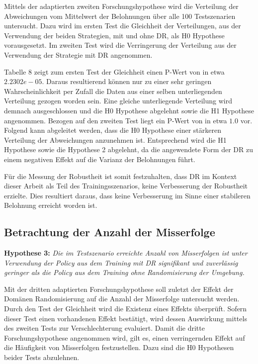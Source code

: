 Mittels der adaptierten zweiten Forschungshypothese wird die Verteilung der Abweichungen vom Mittelwert der Belohnungen über alle 100 Testszenarien untersucht.
Dazu wird im ersten Test die Gleichheit der Verteilungen, aus der Verwendung der beiden Strategien, mit und ohne DR, als H0 Hypothese vorausgesetzt.
Im zweiten Test wird die Verringerung der Verteilung aus der Verwendung der Strategie mit DR angenommen.

Tabelle 8 zeigt zum ersten Test der Gleichheit einen P-Wert von in etwa $2.2302e-05$.
Daraus resultierend können nur zu einer sehr geringen Wahrscheinlichkeit per Zufall die Daten aus einer selben unterliegenden Verteilung gezogen worden sein.
Eine gleiche unterliegende Verteilung wird demnach ausgeschlossen und die H0 Hypothese abgelehnt sowie die H1 Hypothese angenommen.
Bezogen auf den zweiten Test liegt ein P-Wert von in etwa $1.0$ vor.
Folgend kann abgeleitet werden, dass die H0 Hypothese einer stärkeren Verteilung der Abweichungen anzunehmen ist.
Entsprechend wird die H1 Hypothese sowie die Hypothese 2 abgelehnt, da die angewendete Form der DR zu einem negativen Effekt auf die Varianz der Belohnungen führt.

Für die Messung der Robustheit ist somit festzuhalten, dass DR im Kontext dieser Arbeit als Teil des Trainingsszenarios, keine Verbesserung der Robustheit erzielte.
Dies resultiert daraus, dass keine Verbesserung im Sinne einer stabileren Belohnung erreicht worden ist.

\subsection{Betrachtung der Anzahl der Misserfolge}

\textbf{Hypothese 3:}
\textit{Die im Testszenario erreichte Anzahl von Misserfolgen ist unter Verwendung der Policy aus dem Training mit DR signifikant und zuverlässig geringer als die Policy aus dem Training ohne Randomisierung der Umgebung.}

Mit der dritten adaptierten Forschungshypothese soll zuletzt der Effekt der Domänen Randomisierung auf die Anzahl der Misserfolge untersucht werden.
Durch den Test der Gleichheit wird die Existenz eines Effekts überprüft.
Sofern dieser Test einen vorhandenen Effekt bestätigt, wird dessen Auswirkung mittels des zweiten Tests zur Verschlechterung evaluiert.
Damit die dritte Forschungshypothese angenommen wird, gilt es, einen verringernden Effekt auf die Häufigkeit von Misserfolgen festzustellen.
Dazu sind die H0 Hypothesen beider Tests abzulehnen.

